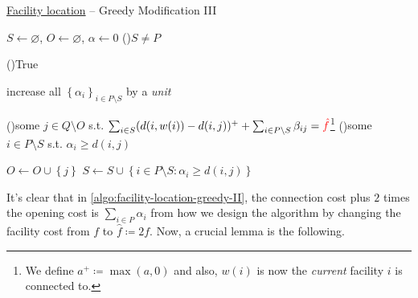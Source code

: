 \begin{algorithm}[H]\label{algo:facility-location-greedy-III}
	\DontPrintSemicolon
	\caption{\hyperref[prb:facility-location]{Facility location} -- Greedy Modification III}
	\BlankLine
	\(S\gets \varnothing \), \(O\gets \varnothing \), \(\alpha \gets 0\) 
	\;
	\While(){\(S \neq P\)}{
	\While(){\textsf{True}}{
	increase all \(\left\{ \alpha _i \right\}_{i\in P\setminus S} \) by a \emph{unit}

	\If(){some \(j\in Q\setminus O\) s.t. \(\sum_{i\in S} (d(i, w(i)) - d(i, j))^+ + \sum_{i\in P\setminus S} \beta _{ij} = \mathcolor{red}{\hat{f}}\)\footnote{We define \(a^+ \coloneqq \max (a, 0)\) and also, \(w(i)\) is now the \emph{current} facility \(i\) is connected to.}}{
			\Break
		}
		\If(){some \(i\in P\setminus S\) s.t. \(\alpha_i \geq d(i, j)\)}{
			\Break
		}
	}
	\(O\gets O \cup \left\{ j \right\} \)
	\(S\gets S \cup \left\{ i\in P\setminus S\colon \alpha _i \geq d(i, j)\right\} \)
	}
	\;
\end{algorithm}

It's clear that in \autoref{algo:facility-location-greedy-II}, the connection cost plus \(2\) times the opening cost is \(\sum_{i\in P} \alpha _i\) from how we design the algorithm by changing the facility cost from \(f\) to \(\hat{f} \coloneqq 2f\). Now, a crucial lemma is the following.

